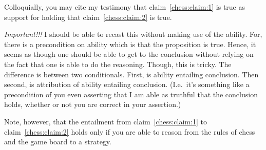 \documentclass[10pt]{article}
\begin{document}
Colloquially, you may cite my testimony that claim~\ref{chess:claim:1} is true as support for holding that claim~\ref{chess:claim:2} is true.

{
  \color{red}
  \emph{Important!!!}
  I should be able to recast this without making use of the ability.
  For, there is a precondition on ability which is that the proposition is true.
  Hence, it seems as though one should be able to get to the conclusion without relying on the fact that one is able to do the reasoning.
  Though, this is tricky.
  The difference is between two conditionals.
  First, is ability entailing conclusion.
  Then second, is attribution of ability entailing conclusion.
  (I.e.\ it's something like a precondition of you even asserting that I am able as truthful that the conclusion holds, whether or not you are correct in your assertion.)
}

Note, however, that the entailment from claim~\ref{chess:claim:1} to claim~\ref{chess:claim:2} holds only if you are able to reason from the rules of chess and the game board to a strategy.
\end{document}
